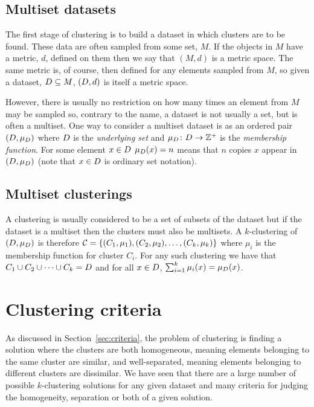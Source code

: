 \subsection{Multiset datasets}
\label{sec:datasets}

The first stage of clustering is to build a dataset in which clusters are to
be found.  These data are often sampled from some set, $M$.  If the objects in
$M$ have a metric, $d$, defined on them then we say that $(M,d)$ is a metric
space.  The same metric is, of course, then defined for any elements sampled
from $M$, so given a dataset, $D \subseteq M$, $(D,d)$ is itself a
metric space.

However, there is usually no restriction on how many times an element from $M$
may be sampled so, contrary to the name, a dataset is not usually a set, but
is often a multiset.  One way to consider a multiset dataset is as an ordered
pair $(D,\mu_{D})$ where $D$ is the \textit{underlying set} and
$\mu_{D} \colon D \to \mathbb{Z}^+$ is the \textit{membership
  function}.  For some element $x \in D$ $\mu_{D}(x) = n$ means that
$n$ copies $x$ appear in $(D,\mu_{D})$ (note that $x \in D$ is
ordinary set notation).

\subsection{Multiset clusterings}
\label{sec:multiset-clusterings}

A clustering is usually considered to be a set of subsets of the dataset but
if the dataset is a multiset then the clusters must also be multisets.  A
$k$-clustering of $(D,\mu_{D})$ is therefore $\mathcal{C} =
\{(C_{1},\mu_{1}),(C_{2},\mu_{2}),\dotsc,(C_{k},\mu_{k})\}$ where $\mu_i$ is
the membership function for cluster $C_i$.  For any such clustering we have
that $C_{1} \cup C_{2} \cup \dotsb \cup C_{k} = D$ and for all $x \in
D$, $\sum_{i=1}^{k} \mu_{i}(x) = \mu_{D}(x)$.

\section{Clustering criteria}
\label{sec:clustering-criteria}

As discussed in Section~\ref{sec:criteria}, the problem of clustering is
finding a solution where the clusters are both homogeneous, meaning elements
belonging to the same cluster are similar, and well-separated, meaning
elements belonging to different clusters are dissimilar.  We have seen that
there are a large number of possible $k$-clustering solutions for any given
dataset and many criteria for judging the homogeneity, separation or both of a
given solution.

